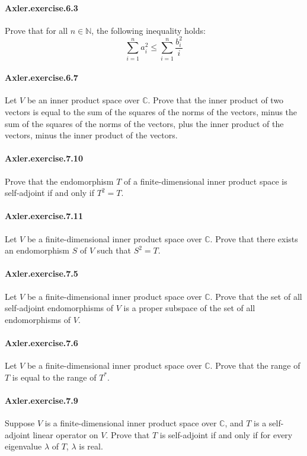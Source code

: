 \documentclass{article}
\begin{document}
\paragraph{Axler.exercise.6.3} Prove that for all $n \in \mathbb{N}$, the following inequality holds: $$\sum_{i=1}^n a_i^2 \leq \sum_{i=1}^n \frac{b_i^2}{i}$$

\paragraph{Axler.exercise.6.7} Let $V$ be an inner product space over $\mathbb{C}$. Prove that the inner product of two vectors is equal to the sum of the squares of the norms of the vectors, minus the sum of the squares of the norms of the vectors, plus the inner product of the vectors, minus the inner product of the vectors.

\paragraph{Axler.exercise.7.10} Prove that the endomorphism $T$ of a finite-dimensional inner product space is self-adjoint if and only if $T^2 = T$.

\paragraph{Axler.exercise.7.11} Let $V$ be a finite-dimensional inner product space over $\mathbb{C}$. Prove that there exists an endomorphism $S$ of $V$ such that $S^2 = T$.

\paragraph{Axler.exercise.7.5} Let $V$ be a finite-dimensional inner product space over $\mathbb{C}$. Prove that the set of all self-adjoint endomorphisms of $V$ is a proper subspace of the set of all endomorphisms of $V$.

\paragraph{Axler.exercise.7.6} Let $V$ be a finite-dimensional inner product space over $\mathbb{C}$. Prove that the range of $T$ is equal to the range of $T^*$.

\paragraph{Axler.exercise.7.9} Suppose $V$ is a finite-dimensional inner product space over $\mathbb{C}$, and $T$ is a self-adjoint linear operator on $V$. Prove that $T$ is self-adjoint if and only if for every eigenvalue $\lambda$ of $T$, $\lambda$ is real.
\end{document}
